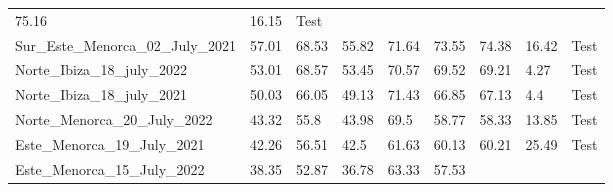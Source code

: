 \begin{table}[H]
{\begin{tabular}{lllllllll}
            75.16
                                                   & 16.15               &
            {\color[HTML]{fc8d62} Test}
            \\
            Sur\_Este\_Menorca\_02\_July\_2021     & 57.01               &
            68.53
                                                   & 55.82               &
            71.64
                                                   & 73.55               &
            74.38
                                                   & 16.42               &
            {\color[HTML]{fc8d62} Test}
            \\
            Norte\_Ibiza\_18\_july\_2022           & 53.01               &
            68.57
                                                   & 53.45               &
            70.57
                                                   & 69.52               &
            69.21
                                                   & 4.27                &
            {\color[HTML]{fc8d62} Test}
            \\
            Norte\_Ibiza\_18\_july\_2021           & 50.03               &
            66.05
                                                   & 49.13               &
            71.43
                                                   & 66.85               &
            67.13
                                                   & 4.4                 &
            {\color[HTML]{fc8d62} Test}
            \\
            Norte\_Menorca\_20\_July\_2022         & 43.32               & 55.8
                                                   & 43.98               & 69.5
                                                   & 58.77               &
            58.33
                                                   & 13.85               &
            {\color[HTML]{fc8d62} Test}
            \\
            Este\_Menorca\_19\_July\_2021          & 42.26               &
            56.51
                                                   & 42.5                &
            61.63
                                                   & 60.13               &
            60.21
                                                   & 25.49               &
            {\color[HTML]{fc8d62} Test}
            \\
            Este\_Menorca\_15\_July\_2022          & 38.35               &
            52.87
                                                   & 36.78               &
            63.33
                                                   & 57.53               &

\end{tabular}}
\end{table}
